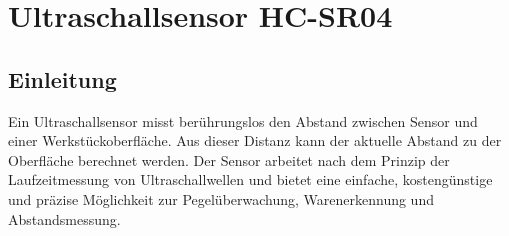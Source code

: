 %
%
%

\chapter{Ultraschallsensor HC-SR04}

\section{Einleitung}
Ein Ultraschallsensor misst berührungslos den Abstand zwischen Sensor und einer Werkstückoberfläche. Aus dieser Distanz kann der aktuelle Abstand zu der Oberfläche berechnet werden. Der Sensor arbeitet nach dem Prinzip der Laufzeitmessung von Ultraschallwellen und bietet eine einfache, kostengünstige und präzise Möglichkeit zur Pegelüberwachung, Warenerkennung und Abstandsmessung.\cite{ArduinoWeb:2025} \cite{Traenkler:2018} \cite{Hering:2023}

